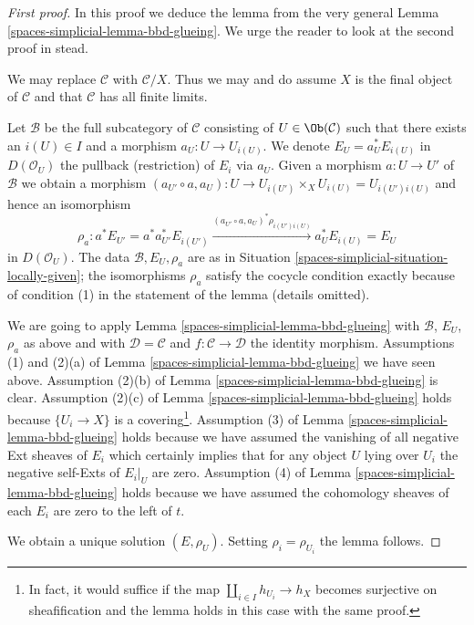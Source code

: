 \begin{proof}[First proof]
In this proof we deduce the lemma from the very general
Lemma \ref{spaces-simplicial-lemma-bbd-glueing}. We urge the reader to look
at the second proof in stead.

\medskip\noindent
We may replace $\mathcal{C}$ with $\mathcal{C}/X$.
Thus we may and do assume $X$ is the final object of $\mathcal{C}$
and that $\mathcal{C}$ has all finite limits.

\medskip\noindent
Let $\mathcal{B}$ be the full subcategory of $\mathcal{C}$
consisting of $U \in \Ob(\mathcal{C})$ such that there exists
an $i(U) \in I$ and a morphism $a_U : U \to U_{i(U)}$.
We denote $E_U = a_U^*E_{i(U)}$ in $D(\mathcal{O}_U)$
the pullback (restriction) of $E_i$ via $a_U$.
Given a morphism $a : U \to U'$ of $\mathcal{B}$
we obtain a morphism
$(a_{U'} \circ a, a_U) : U \to U_{i(U')} \times_X U_{i(U)} = U_{i(U')i(U)}$
and hence an isomorphism
$$
\rho_a :
a^*E_{U'} = a^*a_{U'}^*E_{i(U')}
\xrightarrow{(a_{U'} \circ a, a_U)^*\rho_{i(U')i(U)}}
a_{U}^*E_{i(U)} = E_{U}
$$
in $D(\mathcal{O}_U)$. The data $\mathcal{B}, E_U, \rho_a$
are as in Situation \ref{spaces-simplicial-situation-locally-given}; the
isomorphisms $\rho_a$ satisfy the cocycle condition
exactly because of condition (1) in the statement of the lemma
(details omitted).

\medskip\noindent
We are going to apply Lemma \ref{spaces-simplicial-lemma-bbd-glueing} with $\mathcal{B}$,
$E_U$, $\rho_a$ as above and with $\mathcal{D} = \mathcal{C}$ and
$f : \mathcal{C} \to \mathcal{D}$ the identity morphism.
Assumptions (1) and (2)(a) of Lemma \ref{spaces-simplicial-lemma-bbd-glueing} we have seen above.
Assumption (2)(b) of Lemma \ref{spaces-simplicial-lemma-bbd-glueing} is clear.
Assumption (2)(c) of Lemma \ref{spaces-simplicial-lemma-bbd-glueing} holds because
$\{U_i \to X\}$ is a covering\footnote{In fact, it would suffice
if the map $\coprod_{i \in I} h_{U_i} \to h_X$ becomes
surjective on sheafification and the lemma holds in this case
with the same proof.}.
Assumption (3) of Lemma \ref{spaces-simplicial-lemma-bbd-glueing} holds
because we have assumed the vanishing of all negative Ext sheaves
of $E_i$ which certainly implies that for any object $U$ lying over $U_i$
the negative self-Exts of $E_i|_U$ are zero.
Assumption (4) of Lemma \ref{spaces-simplicial-lemma-bbd-glueing} holds because
we have assumed the cohomology sheaves of each $E_i$ are zero
to the left of $t$.

\medskip\noindent
We obtain a unique solution $(E, \rho_U)$.
Setting $\rho_i = \rho_{U_i}$ the lemma follows.
\end{proof}

